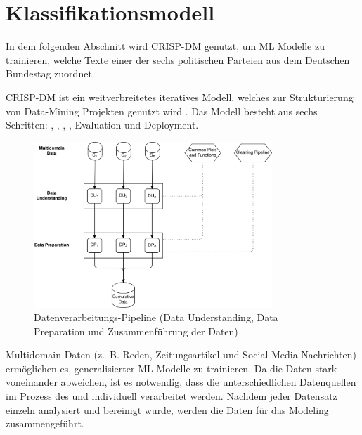 
\chapter{Klassifikationsmodell} \label{ch:crispDm}

In dem folgenden Abschnitt wird \ac{CRISP-DM} genutzt, um \ac{ML} Modelle zu trainieren, welche Texte einer der sechs politischen Parteien aus dem Deutschen Bundestag zuordnet. 


\ac{CRISP-DM} ist ein weitverbreitetes iteratives Modell, welches zur Strukturierung von Data-Mining Projekten genutzt wird \autocite{martinez-plumed_casp-dm_2017, chapman_crisp-dm_2000}. Das Modell besteht aus sechs Schritten: , , , , Evaluation und Deployment. 

\begin{figure}[H]
    \centering
    \includegraphics[width=0.8\textwidth]{data/images/data_flow_v2_1.png}
    \caption[Datenverarbeitungs-Pipeline]{Datenverarbeitungs-Pipeline (Data Understanding, Data Preparation und Zusammenführung der Daten)} \label{fig:dataFlow_1}
\end{figure}


Multidomain Daten (z. B. Reden, Zeitungsartikel und Social Media Nachrichten) ermöglichen es, generalisierter \ac{ML} Modelle zu trainieren. Da die Daten stark voneinander abweichen, ist es notwendig, dass die unterschiedlichen Datenquellen im Prozess des  und  individuell verarbeitet werden. Nachdem jeder Datensatz einzeln analysiert und bereinigt wurde, werden die Daten für das Modeling zusammengeführt.

